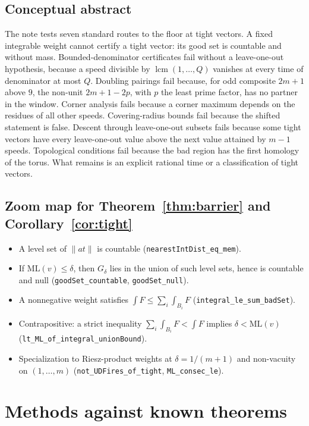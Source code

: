 \documentclass[11pt]{article}
\theoremstyle{remark}
\newcommand{\norm}[1]{\lVert #1\rVert}
\newcommand{\ML}{\mathrm{ML}}
\begin{document}
\subsection{Conceptual abstract}
The note tests seven standard routes to the floor at tight vectors. A fixed integrable weight cannot certify a tight vector: its good set is countable and without mass. Bounded-denominator certificates fail without a leave-one-out hypothesis, because a speed divisible by $\operatorname{lcm}(1,\dots,Q)$ vanishes at every time of denominator at most $Q$. Doubling pairings fail because, for odd composite $2m+1$ above $9$, the non-unit $2m+1-2p$, with $p$ the least prime factor, has no partner in the window. Corner analysis fails because a corner maximum depends on the residues of all other speeds. Covering-radius bounds fail because the shifted statement is false. Descent through leave-one-out subsets fails because some tight vectors have every leave-one-out value above the next value attained by $m-1$ speeds. Topological conditions fail because the bad region has the first homology of the torus. What remains is an explicit rational time or a classification of tight vectors.

\subsection{Zoom map for Theorem~\ref{thm:barrier} and Corollary~\ref{cor:tight}}
\begin{itemize}
\item[L1.1] A level set of $\norm{at}$ is countable (\texttt{nearestIntDist\_eq\_mem}).
\item[L1.2] If $\ML(v)\le\delta$, then $G_\delta$ lies in the union of such level sets, hence is countable and null (\texttt{goodSet\_countable}, \texttt{goodSet\_null}).
\item[L1.3] A nonnegative weight satisfies $\int F\le\sum_i\int_{B_i}F$ (\texttt{integral\_le\_sum\_badSet}).
\item[L1.4] Contrapositive: a strict inequality $\sum_i\int_{B_i}F<\int F$ implies $\delta<\ML(v)$ (\texttt{lt\_ML\_of\_integral\_unionBound}).
\item[L1.5] Specialization to Riesz-product weights at $\delta=1/(m+1)$ and non-vacuity on $(1,\dots,m)$ (\texttt{not\_UDFires\_of\_tight}, \texttt{ML\_consec\_le}).
\end{itemize}

\section{Methods against known theorems}\label{sec:pos}
\end{document}
